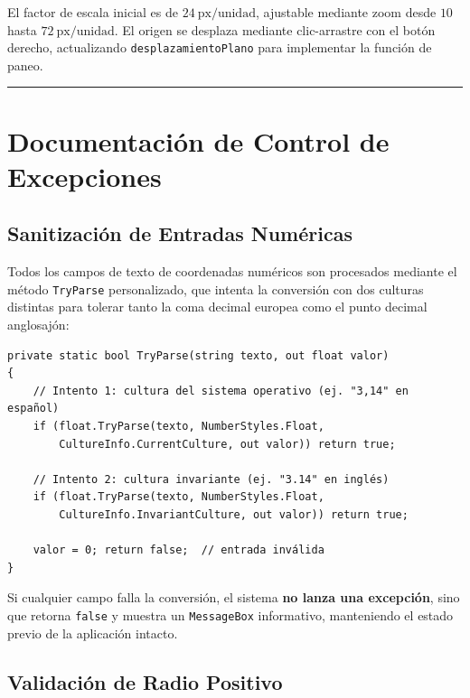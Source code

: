 \documentclass[
  spanish,
  a4paper,
  12pt,
]{article}
\newcommand{\passthrough}[1]{#1}
\begin{document}
El factor de escala inicial es de \(24\ \text{px/unidad}\), ajustable
mediante zoom desde \(10\) hasta \(72\ \text{px/unidad}\). El origen se
desplaza mediante clic-arrastre con el botón derecho, actualizando
\passthrough{\lstinline!desplazamientoPlano!} para implementar la
función de paneo.

\begin{center}\rule{0.5\linewidth}{0.5pt}\end{center}

\section{Documentación de Control de
Excepciones}\label{documentaciuxf3n-de-control-de-excepciones}

\subsection{Sanitización de Entradas
Numéricas}\label{sanitizaciuxf3n-de-entradas-numuxe9ricas}

Todos los campos de texto de coordenadas numéricos son procesados
mediante el método \passthrough{\lstinline!TryParse!} personalizado, que
intenta la conversión con dos culturas distintas para tolerar tanto la
coma decimal europea como el punto decimal anglosajón:

\begin{lstlisting}
private static bool TryParse(string texto, out float valor)
{
    // Intento 1: cultura del sistema operativo (ej. "3,14" en español)
    if (float.TryParse(texto, NumberStyles.Float,
        CultureInfo.CurrentCulture, out valor)) return true;

    // Intento 2: cultura invariante (ej. "3.14" en inglés)
    if (float.TryParse(texto, NumberStyles.Float,
        CultureInfo.InvariantCulture, out valor)) return true;

    valor = 0; return false;  // entrada inválida
}
\end{lstlisting}

Si cualquier campo falla la conversión, el sistema \textbf{no lanza una
excepción}, sino que retorna \passthrough{\lstinline!false!} y muestra
un \passthrough{\lstinline!MessageBox!} informativo, manteniendo el
estado previo de la aplicación intacto.

\subsection{Validación de Radio
Positivo}\label{validaciuxf3n-de-radio-positivo}
\end{document}
